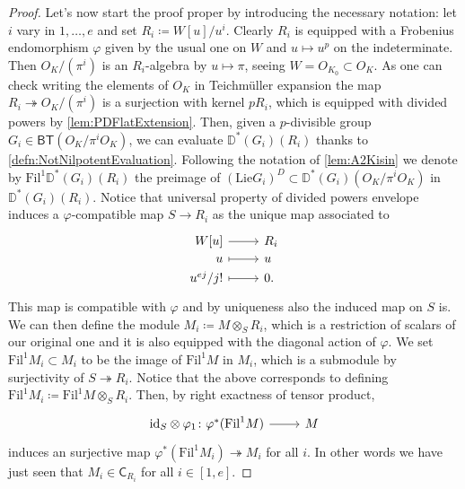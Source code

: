 \begin{proof}
Let's now start the proof proper by introducing the necessary notation:
let $i$ vary in $1, \ldots, e$ and set $R_i \coloneqq W[u]/u^i$.
Clearly $R_i$ is equipped with a Frobenius endomorphism $\varphi$
given by the usual one on $W$ and $u \mapsto u^p$ on the indeterminate.
Then $O_K/ (\pi^i)$ is an $R_i$-algebra by $u \mapsto \pi$,
seeing $W = O_{K_0} \subset O_K$.
As one can check writing the elements of $O_K$ in Teichmüller expansion
the map $R_i \twoheadrightarrow O_K/ (\pi^i)$ is a surjection
with kernel $pR_i$, which is equipped with divided powers by \cref{lem:PDFlatExtension}.
Then, given a $p$-divisible group $G_i \in \mathsf{BT}(O_K/\pi^iO_K)$,
we can evaluate $\mathbb{D}^*(G_i)(R_i)$ thanks to \cref{defn:NotNilpotentEvaluation}.
Following the notation of \cref{lem:A2Kisin}
we denote by $\mathrm{Fil}^1\mathbb{D}^*(G_i)(R_i)$
the preimage of $\left( \mathrm{Lie}G_i \right)^D \subset \mathbb{D}^*(G_i)(O_K/\pi^iO_K)$
in $\mathbb{D}^*(G_i)(R_i)$.
Notice that universal property of divided powers envelope
induces a $\varphi$-compatible map $S \to R_i$ as the unique map associated to
\begin{equation*}
\begin{tikzcd}[row sep = 0ex
	,/tikz/column 1/.append style={anchor=base east}
	,/tikz/column 2/.append style={anchor=base west}]
	W[u] \arrow[r, "", rightarrow] &
	R_i \\
	u \arrow[r, "", mapsto] & u \\
	u^{ej} / j!  \arrow[r, "", mapsto] & 0
.\end{tikzcd}
\end{equation*} 
This map is compatible with $\varphi$ and by uniqueness also
the induced map on $S$ is.
We can then define the module $M_i \coloneqq M \otimes_S R_i$,
which is a restriction of scalars of our original one and
it is also equipped with the diagonal action of $\varphi$.
We set $\mathrm{Fil}^1 M_i \subset M_i$
to be the image of $\mathrm{Fil}^1 M$ in $M_i$, which is a submodule
by surjectivity of $S \twoheadrightarrow R_i$.
Notice that the above corresponds to defining $\mathrm{Fil}^1 M_i \coloneqq
\mathrm{Fil}^1 M \otimes_S R_i$.
Then, by right exactness of tensor product, 
\begin{equation*}
\begin{tikzcd}[row sep = 0ex
	,/tikz/column 1/.append style={anchor=base east}
	,/tikz/column 2/.append style={anchor=base west}]
	\mathrm{id}_{ S } \otimes \varphi_1
	\colon 
	\varphi^*(\mathrm{Fil}^1 M)\arrow[r, "", rightarrow] &
	M
\end{tikzcd}
\end{equation*} 
induces an surjective map $\varphi^*(\mathrm{Fil}^1 M_i) \twoheadrightarrow M_i$
for all $i$.
In other words we have just seen that
$M_i \in \mathsf{C}_{R_i}$ for all $i \in [1,e]$.


\end{proof}
